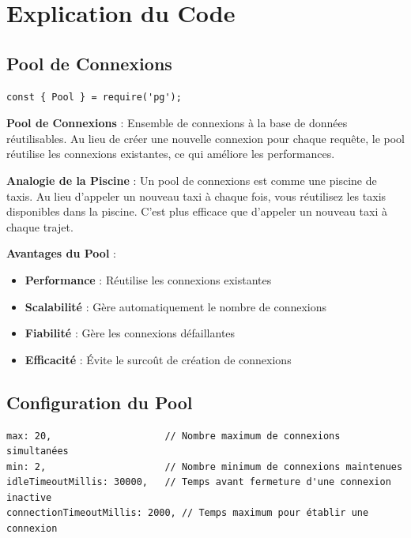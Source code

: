 \section{Explication du Code}

\subsection{Pool de Connexions}

\begin{lstlisting}[style=javascript]
const { Pool } = require('pg');
\end{lstlisting}

\begin{definitionbox}
    \textbf{Pool de Connexions} : Ensemble de connexions à la base de données réutilisables. Au lieu de créer une nouvelle connexion pour chaque requête, le pool réutilise les connexions existantes, ce qui améliore les performances.
\end{definitionbox}

\begin{analogybox}
    \textbf{Analogie de la Piscine} : Un pool de connexions est comme une piscine de taxis. Au lieu d'appeler un nouveau taxi à chaque fois, vous réutilisez les taxis disponibles dans la piscine. C'est plus efficace que d'appeler un nouveau taxi à chaque trajet.
\end{analogybox}

\textbf{Avantages du Pool} :
\begin{itemize}
    \item \textbf{Performance} : Réutilise les connexions existantes
    \item \textbf{Scalabilité} : Gère automatiquement le nombre de connexions
    \item \textbf{Fiabilité} : Gère les connexions défaillantes
    \item \textbf{Efficacité} : Évite le surcoût de création de connexions
\end{itemize}

\subsection{Configuration du Pool}

\begin{lstlisting}[style=javascript]
max: 20,                    // Nombre maximum de connexions simultanées
min: 2,                     // Nombre minimum de connexions maintenues
idleTimeoutMillis: 30000,   // Temps avant fermeture d'une connexion inactive
connectionTimeoutMillis: 2000, // Temps maximum pour établir une connexion
\end{lstlisting}

